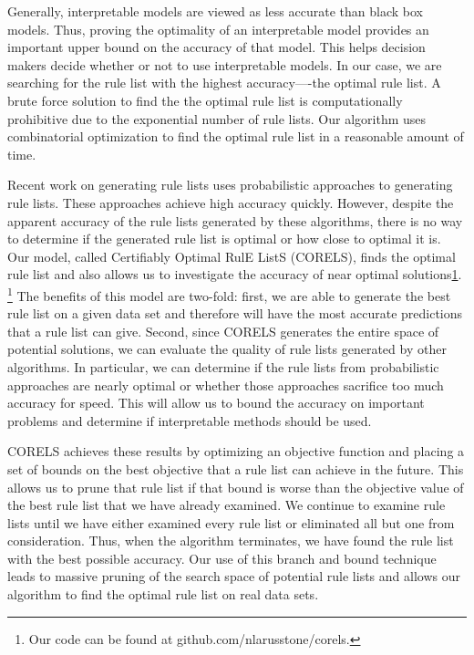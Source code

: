 Generally, interpretable models are viewed as less accurate than black box models.
Thus, proving the optimality of an interpretable model provides an important upper bound on the accuracy of that model.
This helps decision makers decide whether or not to use interpretable models.
In our case, we are searching for the rule list with the highest accuracy----the optimal rule list. 
A brute force solution to find the the optimal rule list is computationally prohibitive due to the exponential number of rule lists.
Our algorithm uses combinatorial optimization to find the optimal rule list in a reasonable amount of time.

Recent work on generating rule lists \cite{LethamRuMcMa15,YangRuSe16} uses probabilistic approaches to generating rule lists.
These approaches achieve high accuracy quickly.
However, despite the apparent accuracy of the rule lists generated by these algorithms, there is no way to determine if the generated rule list is optimal or how close to optimal it is. 
Our model, called Certifiably Optimal RulE ListS (CORELS), finds the optimal rule list and also allows us to investigate the accuracy of near optimal solutions\ref{footnote:code}. 
\footnote{\label{footnote:code} Our code can be found at github.com/nlarusstone/corels.}
The benefits of this model are two-fold: first, we are able to generate the best rule list on a given data set and therefore will have the most accurate predictions that a rule list can give.
Second, since CORELS generates the entire space of potential solutions, we can evaluate the quality of rule lists generated by other algorithms. 
In particular, we can determine if the rule lists from probabilistic approaches are nearly optimal or whether those approaches sacrifice too much accuracy for speed.
This will allow us to bound the accuracy on important problems and determine if interpretable methods should be used.

CORELS achieves these results by optimizing an objective function and placing a set of bounds on the best objective that a rule list can achieve in the future. 
This allows us to prune that rule list if that bound is worse than the objective value of the best rule list that we have already examined.
We continue to examine rule lists until we have either examined every rule list or eliminated all but one from consideration. 
Thus, when the algorithm terminates, we have found the rule list with the best possible accuracy. 
Our use of this branch and bound technique leads to massive pruning of the search space of potential rule lists and allows our algorithm to find the optimal rule list on real data sets.

